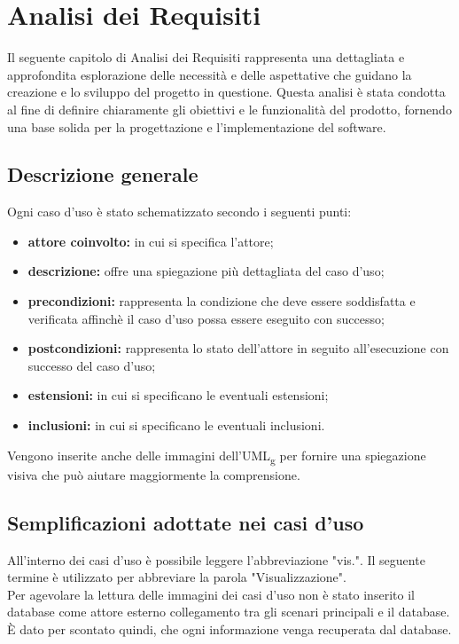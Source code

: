 \chapter{Analisi dei Requisiti}
\label{cap:analisi-requisiti}

Il seguente capitolo di Analisi dei Requisiti rappresenta una dettagliata e approfondita esplorazione delle necessità e delle aspettative che guidano la creazione e lo sviluppo del progetto in questione. Questa analisi è stata condotta al fine di definire chiaramente gli obiettivi e le funzionalità del prodotto, fornendo una base solida per la progettazione e l'implementazione del software.\\

\section{Descrizione generale}
Ogni caso d'uso è stato schematizzato secondo i seguenti punti:
\begin{itemize}
\item \textbf{attore coinvolto:} in cui si specifica l'attore;
\item \textbf{descrizione:} offre una spiegazione più dettagliata del caso d'uso; 
\item \textbf{precondizioni:} rappresenta la condizione che deve essere soddisfatta e verificata affinchè il caso d'uso possa essere eseguito con successo;
\item \textbf{postcondizioni:} rappresenta lo stato dell'attore in seguito all'esecuzione con successo del caso d'uso;
\item \textbf{estensioni:} in cui si specificano le eventuali estensioni;
\item \textbf{inclusioni:} in cui si specificano le eventuali inclusioni.
\end{itemize}
Vengono inserite anche delle immagini dell'UML\textsubscript{g} per fornire una spiegazione visiva che può aiutare maggiormente la comprensione.

\section{Semplificazioni adottate nei casi d'uso}
All'interno dei casi d'uso è possibile leggere l'abbreviazione "vis.". Il seguente termine è utilizzato per abbreviare la parola "Visualizzazione".\\
Per agevolare la lettura delle immagini dei casi d'uso non è stato inserito il database come attore esterno collegamento tra gli scenari principali e il database. È dato per scontato quindi, che ogni informazione venga recuperata dal database.\\

